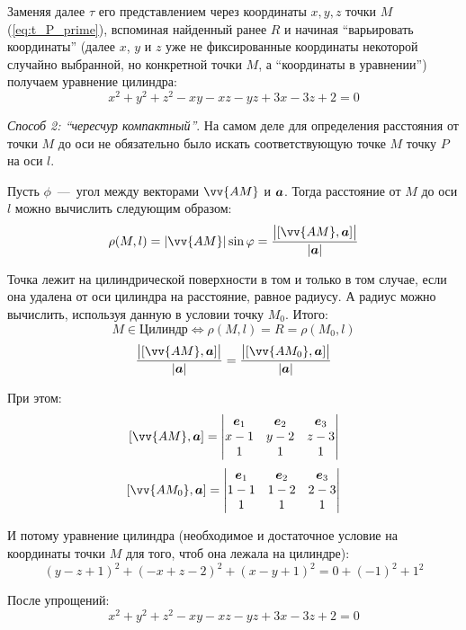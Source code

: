 \documentclass[a4paper,12pt]{article}
\begin{document}
\begin{solution}
    Заменяя далее $\tau$ его представлением через координаты $x, y, z$ точки $M$ (\ref{eq:t_P_prime}), вспоминая найденный ранее $R$ и начиная ``варьировать координаты'' (далее $x$, $y$ и $z$ уже не фиксированные координаты некоторой случайно выбранной, но конкретной точки $M$, а ``координаты в уравнении'') получаем уравнение цилиндра:
    \[
      x^2 + y^2 + z^2 - xy - xz - yz + 3x - 3z + 2 = 0
    \]
    
    \medskip
    
    \emph{Способ 2: ``чересчур компактный''}.
    На самом деле для определения расстояния от точки $M$ до оси не обязательно было искать соответствующую точке $M$ точку $P$ на оси $l$.
    
    Пусть $\phi$~---~угол между векторами $\vv{AM}$ и $\boldsymbol a$.
    Тогда расстояние от $M$ до оси $l$ можно вычислить следующим образом:
    \[
      \rho(M, l) = |\vv{AM}| \sin\phi
        = \frac{\bigl|[\vv{AM}, \bds a]\bigr|}{|\bds a|}
    \]
    
    Точка лежит на цилиндрической поверхности в том и только в том случае, если она удалена от оси цилиндра на расстояние, равное радиусу.
    А радиус можно вычислить, используя данную в условии точку $M_0$.
    Итого:
    \[
      M \in \mbox{Цилиндр} \Leftrightarrow \rho(M, l) = R = \rho(M_0, l)
    \]
    \[
      \frac{\bigl|[\vv{AM}, \bds a]\bigr|}{|\bds a|} = \frac{\bigl|[\vv{AM_0}, \bds a]\bigr|}{|\bds a|}
    \]
    
    При этом:
    \[
      [\vv{AM}, \bds a] = \begin{vmatrix}
        \bds e_1 & \bds e_2 & \bds e_3\\
        x - 1    & y - 2    & z - 3\\
        1        & 1        & 1
      \end{vmatrix}
    \]
    \[
      [\vv{AM_0}, \bds a] = \begin{vmatrix}
        \bds e_1 & \bds e_2 & \bds e_3\\
        1 - 1    & 1 - 2    & 2 - 3\\
        1        & 1        & 1
      \end{vmatrix}
    \]
    
    И потому уравнение цилиндра (необходимое и достаточное условие на координаты точки $M$ для того, чтоб она лежала на цилиндре):
    \[
      (y - z + 1)^2 + (-x + z - 2)^2 + (x - y + 1)^2 = 0 + (-1)^2 + 1^2
    \]
    
    После упрощений:
    \[
      x^2 + y^2 + z^2 - xy - xz - yz + 3x - 3z + 2 = 0
    \]
  \end{solution}
  
\end{document}
